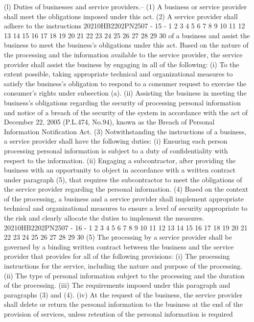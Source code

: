 (l) Duties of businesses and service providers.--
(1) A business or service provider shall meet the
obligations imposed under this act.
(2) A service provider shall adhere to the instructions
20210HB2202PN2507 - 15 -
1
2
3
4
5
6
7
8
9
10
11
12
13
14
15
16
17
18
19
20
21
22
23
24
25
26
27
28
29
30
of a business and assist the business to meet the business's
obligations under this act. Based on the nature of the
processing and the information available to the service
provider, the service provider shall assist the business by
engaging in all of the following:
(i) To the extent possible, taking appropriate
technical and organizational measures to satisfy the
business's obligation to respond to a consumer request to
exercise the consumer's rights under subsection (a).
(ii) Assisting the business in meeting the
business's obligations regarding the security of
processing personal information and notice of a breach of
the security of the system in accordance with the act of
December 22, 2005 (P.L.474, No.94), known as the Breach
of Personal Information Notification Act.
(3) Notwithstanding the instructions of a business, a
service provider shall have the following duties:
(i) Ensuring each person processing personal
information is subject to a duty of confidentiality with
respect to the information.
(ii) Engaging a subcontractor, after providing the
business with an opportunity to object in accordance with
a written contract under paragraph (5), that requires the
subcontractor to meet the obligations of the service
provider regarding the personal information.
(4) Based on the context of the processing, a business
and a service provider shall implement appropriate technical
and organizational measures to ensure a level of security
appropriate to the risk and clearly allocate the duties to
implement the measures.
20210HB2202PN2507 - 16 -
1
2
3
4
5
6
7
8
9
10
11
12
13
14
15
16
17
18
19
20
21
22
23
24
25
26
27
28
29
30
(5) The processing by a service provider shall be
governed by a binding written contract between the business
and the service provider that provides for all of the
following provisions:
(i) The processing instructions for the service,
including the nature and purpose of the processing.
(ii) The type of personal information subject to the
processing and the duration of the processing.
(iii) The requirements imposed under this paragraph
and paragraphs (3) and (4).
(iv) At the request of the business, the service
provider shall delete or return the personal information
to the business at the end of the provision of services,
unless retention of the personal information is required
